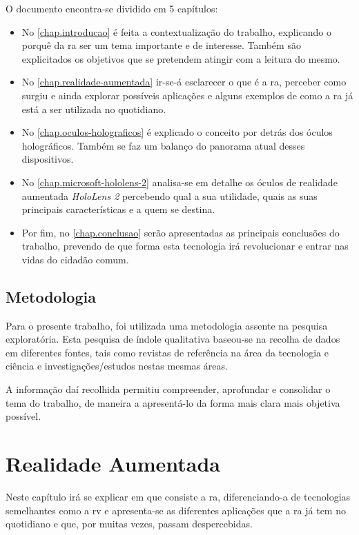 \documentclass{report}
\begin{document}
O documento encontra-se dividido em 5 capítulos:
\begin{itemize}
    \item No \autoref{chap.introducao} é feita a contextualização do trabalho, explicando o porquê da \ac{ra} ser um tema importante e de interesse. Também são explicitados os objetivos que se pretendem atingir com a leitura do mesmo.
    \item No \autoref{chap.realidade-aumentada} ir-se-á esclarecer o que é a \ac{ra}, perceber como surgiu e ainda explorar possíveis aplicações e alguns exemplos de como a \ac{ra} já está a ser utilizada no quotidiano.
    \item No \autoref{chap.oculos-holograficos} é explicado o conceito por detrás dos óculos holográficos. Também se faz um balanço do panorama atual desses dispositivos.
    \item No \autoref{chap.microsoft-hololens-2} analisa-se em detalhe os óculos de realidade aumentada \textit{HoloLens 2} percebendo qual a sua utilidade, quais as suas principais características e a quem se destina.
    \item Por fim, no \autoref{chap.conclusao} serão apresentadas as principais conclusões do trabalho, prevendo de que forma esta tecnologia irá revolucionar e entrar nas vidas do cidadão comum.
\end{itemize}

\section{Metodologia}
Para o presente trabalho, foi utilizada uma metodologia assente na pesquisa exploratória. Esta pesquisa de índole qualitativa baseou-se na recolha de dados em diferentes fontes, tais como revistas de referência na área da tecnologia e ciência e investigações/estudos nestas mesmas áreas.

A informação daí recolhida permitiu compreender, aprofundar e consolidar o tema do trabalho, de maneira a apresentá-lo da forma mais clara mais objetiva possível.

\chapter{Realidade Aumentada}
\label{chap.realidade-aumentada}
Neste capítulo irá se explicar em que consiste a \ac{ra}, diferenciando-a de tecnologias semelhantes como a \ac{rv} e apresenta-se as diferentes aplicações que a \ac{ra} já tem no quotidiano e que, por muitas vezes, passam despercebidas.
\end{document}
